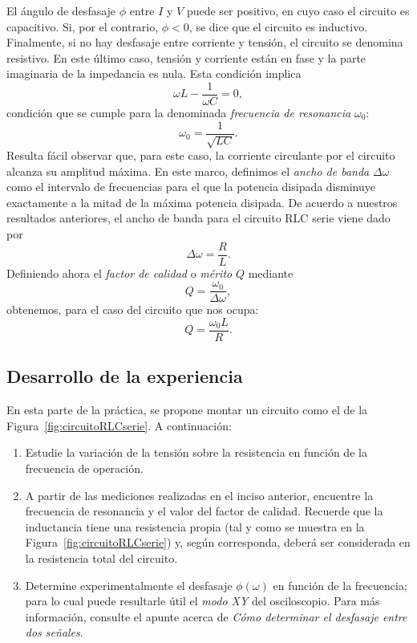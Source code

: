 \documentclass[laboratorio]{guia}
\begin{document}
El \'angulo de desfasaje $\phi$ entre $I$ y $V$ puede ser positivo, en cuyo
caso el circuito es capacitivo. Si, por el contrario, $\phi < 0$, se dice que
el circuito es inductivo. Finalmente, si no hay desfasaje entre corriente y 
tensi\'on, el circuito se denomina resistivo. En este \'ultimo caso, tensi\'on
y corriente est\'an en fase y la parte imaginaria de la impedancia es nula.
Esta condici\'on implica
\begin{equation}
    \omega L - \frac{1}{\omega C} = 0,
\end{equation}
condici\'on que se cumple para la denominada {\it frecuencia de resonancia} 
$\omega_0$:
\begin{equation}
    \omega_0 = \frac{1}{\sqrt{LC}}.
\end{equation}
Resulta f\'acil observar que, para este caso, la corriente circulante por 
el circuito alcanza su amplitud m\'axima. En este marco, definimos el 
{\it ancho de banda} $\Delta \omega$ como el intervalo de frecuencias para
el que la potencia disipada disminuye exactamente a la mitad de la m\'axima
potencia disipada. De acuerdo a nuestros resultados anteriores, el 
ancho de banda para el circuito RLC serie viene dado por
\begin{equation}
    \Delta \omega = \frac{R}{L}.
\end{equation}
Definiendo ahora el {\it factor de calidad} o {\it m\'erito} $Q$ mediante
\begin{equation}
    Q = \frac{\omega_0}{\Delta \omega},
\end{equation}
obtenemos, para el caso del circuito que nos ocupa:
\begin{equation}
    Q = \frac{\omega_0 L}{R}.
\end{equation}

\subsection{Desarrollo de la experiencia}

En esta parte de la pr\'actica, se propone montar un circuito como el de la
Figura~\ref{fig:circuitoRLCserie}. A continuaci\'on:
\begin{enumerate}
    \item Estudie la variaci\'on de la tensi\'on sobre la resistencia en 
        funci\'on de la frecuencia de operaci\'on. 
    \item A partir de las mediciones realizadas en el inciso anterior,
        encuentre la frecuencia de resonancia y el valor del factor de
        calidad. Recuerde que la inductancia tiene una resistencia propia 
        (tal y como se muestra
        en la Figura~\ref{fig:circuitoRLCserie}) y, seg\'un corresponda,
        deber\'a ser considerada en la resistencia total del circuito.
    \item Determine experimentalmente el desfasaje $\phi(\omega)$ en funci\'on 
        de la frecuencia; para lo cual puede resultarle \'util el {\it modo XY}
        del osciloscopio. Para m\'as informaci\'on, consulte el apunte acerca
        de {\it C\'omo determinar el desfasaje entre dos se\~nales}.
\end{enumerate}
\end{document}
